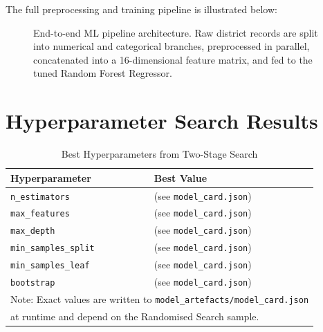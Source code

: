 \documentclass[conference]{IEEEtran}
\begin{document}
The full preprocessing and training pipeline is illustrated below:

\begin{figure}[H]
    \centering
    \caption{End-to-end ML pipeline architecture. Raw district records are split into numerical and categorical branches, preprocessed in parallel, concatenated into a 16-dimensional feature matrix, and fed to the tuned Random Forest Regressor.}
    \label{fig:pipeline}
\end{figure}

\section{Hyperparameter Search Results}
\label{app:hpo}

\begin{table}[H]
\centering
\caption{Best Hyperparameters from Two-Stage Search}
\label{tab:best_params}
\begin{tabular}{@{}ll@{}}
\toprule
\textbf{Hyperparameter} & \textbf{Best Value} \\
\midrule
\texttt{n\_estimators}       & (see \texttt{model\_card.json}) \\
\texttt{max\_features}       & (see \texttt{model\_card.json}) \\
\texttt{max\_depth}          & (see \texttt{model\_card.json}) \\
\texttt{min\_samples\_split} & (see \texttt{model\_card.json}) \\
\texttt{min\_samples\_leaf}  & (see \texttt{model\_card.json}) \\
\texttt{bootstrap}           & (see \texttt{model\_card.json}) \\
\bottomrule
\multicolumn{2}{l}{\small Note: Exact values are written to \texttt{model\_artefacts/model\_card.json}}\\
\multicolumn{2}{l}{\small at runtime and depend on the Randomised Search sample.}
\end{tabular}
\end{table}
\end{document}
